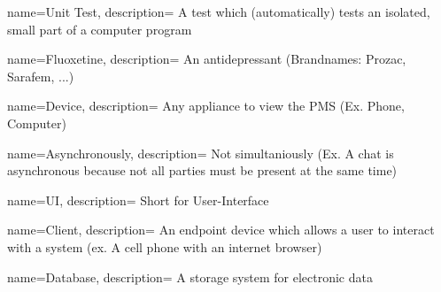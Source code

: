 {  
    name={Unit Test},
    description={
        A test which (automatically) tests an isolated, small part of a computer program
    }
}

{  
    name={Fluoxetine},
    description={
        An antidepressant (Brandnames: Prozac, Sarafem, ...)
    }
}

{  
    name={Device},
    description={
      Any appliance to view the PMS (Ex. Phone, Computer)
    }
}

{  
    name={Asynchronously},
    description={
      Not simultaniously (Ex. A chat is asynchronous because not all parties must be present at the same time)
    }
}

{  
    name={UI},
    description={
      Short for User-Interface
    }
}

{
    name={Client},
    description={
      An endpoint device which allows a user to interact with a system (ex. A cell phone with an internet browser)
    }
}

{
    name={Database},
    description={
      A storage system for electronic data
    }
}
